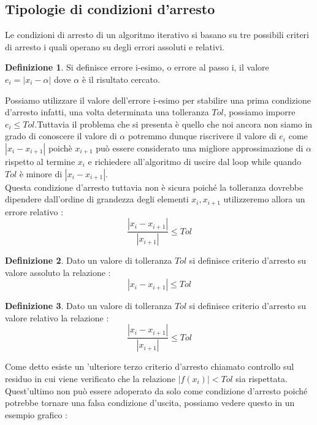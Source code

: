 \documentclass[12pt, a4paper]{book}
\theoremstyle{definition}
\newtheorem{defn}{Definizione}[section]
\begin{document}
\begin{flushleft}
\subsection{Tipologie di condizioni d'arresto}
Le condizioni di arresto di un algoritmo iterativo si basano su tre possibili criteri di arresto i quali operano su degli errori assoluti e relativi.
\begin{defn}
Si definisce errore i-esimo, o errore al passo i, il valore $e_{i} = |x_{i} - \alpha|$ dove $\alpha$ è il risultato cercato. 
\end{defn}
Possiamo utilizzare il valore dell'errore i-esimo per stabilire una prima condizione d'arresto infatti, una volta determinata una tolleranza $Tol$, possiamo imporre $e_{i} \leq Tol$.Tuttavia il problema che si presenta è quello che noi ancora non siamo in grado di conoscere il valore di $\alpha$ potremmo dunque riscrivere  il valore di $e_{i}$ come $|x_{i} - x_{i+1}|$ poichè $x_{i+1}$ può essere considerato una migliore approssimazione di $\alpha$ rispetto al termine $x_{i}$ e richiedere all'algoritmo di uscire dal loop while quando $Tol$ è minore di $|x_{i} - x_{i+1}|$.\\
\vspace{1em}
Questa condizione d'arresto tuttavia non è sicura poiché la tolleranza dovrebbe dipendere dall'ordine di grandezza degli elementi $x_{i}, x_{i+1}$ utilizzeremo allora un errore relativo : 
\[ 
	\dfrac{|x_{i} - x_{i+1}|}{|x_{i+1}|} \leq Tol
\]

\begin{defn}
Dato un valore di tolleranza $Tol$ si definisce criterio d'arresto su valore assoluto la relazione : 
\[ 
	|x_{i} - x_{i+1}| \leq Tol
\]
\end{defn}


\begin{defn}
Dato un valore di tolleranza $Tol$ si definisce criterio d'arresto su valore relativo la relazione : 
\[ 
	\dfrac{|x_{i} - x_{i+1}|}{|x_{i+1}|} \leq Tol
\]
\end{defn}

Come detto esiste un 'ulteriore terzo criterio d'arresto chiamato controllo sul residuo in cui viene verificato che la relazione $|f(x_{i})| < Tol$ sia rispettata.  
\pagebreak
Quest'ultimo non può essere adoperato da solo come condizione d'arresto poiché potrebbe tornare una falsa condizione d'uscita, possiamo vedere  questo in un esempio grafico : 

\begin{figure}[ht!]
\centering
{}
\end{figure}
\end{flushleft}
\end{document}
